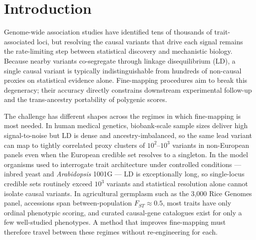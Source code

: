 \section*{Introduction}

Genome-wide association studies have identified tens of thousands of
trait-associated loci\cite{visscher2017years,buniello2019nhgri},
but resolving the causal variants that drive each signal remains the
rate-limiting step between statistical discovery and mechanistic
biology. Because nearby variants co-segregate through linkage
disequilibrium (LD), a single causal variant is typically
indistinguishable from hundreds of non-causal proxies on statistical
evidence alone. Fine-mapping procedures aim to break this
degeneracy\cite{schaid2018genome,ulirsch2021fine}; their accuracy
directly constrains downstream experimental follow-up and the
trans-ancestry portability of polygenic scores.

The challenge has different shapes across the regimes in which
fine-mapping is most needed. In human medical genetics, biobank-scale
sample sizes deliver high signal-to-noise but LD is dense and
ancestry-imbalanced, so the same lead variant can map to tightly
correlated proxy clusters of $10^2$--$10^3$ variants in non-European
panels even when the European credible set resolves to a singleton.
In the model organisms used to interrogate trait architecture under
controlled conditions --- inbred yeast and \emph{Arabidopsis} 1001G ---
LD is exceptionally long, so single-locus credible sets routinely
exceed $10^3$ variants and statistical resolution alone cannot
isolate causal variants. In agricultural germplasm such as the
3{,}000 Rice Genomes panel\cite{wang2018genomic}, accessions span
between-population $F_{ST}\!\approx\!0.5$, most traits have only
ordinal phenotypic scoring, and curated causal-gene catalogues exist
for only a few well-studied phenotypes\cite{ren2023rice}. A method
that improves fine-mapping must therefore travel between these
regimes without re-engineering for each.

